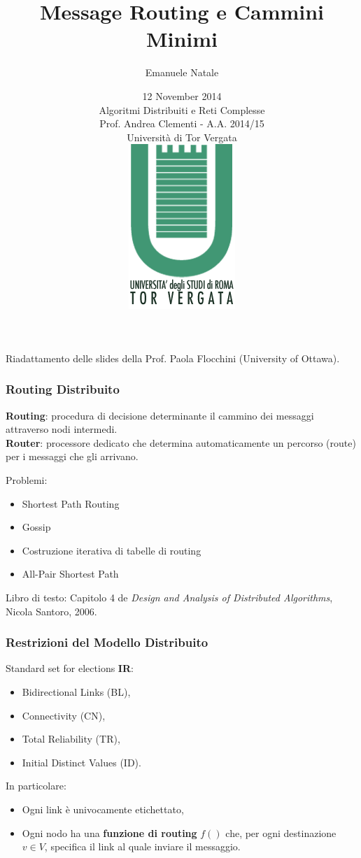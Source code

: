\documentclass[10pt,xcolor=dvipsnames]{beamer}
\author[Emanuele Natale]{Emanuele Natale}
\institute{Sapienza Università di Roma 
}
\title{Message Routing e Cammini Minimi}
\date{12 November 2014 \\ 
Algoritmi Distribuiti e Reti Complesse \\ Prof. Andrea Clementi - A.A. 2014/15 
\\ Università di Tor Vergata \\ 
\vspace{8pt}\includegraphics[scale=0.28]{logo-uniroma2.png}} %
\begin{document}
\begin{frame}
	\titlepage
\vfill

{\tiny Riadattamento delle slides della Prof. Paola Flocchini (University of Ottawa).}
\end{frame}

\begin{frame}
	\frametitle{Routing Distribuito}

	\textbf{Routing}: procedura di decisione determinante il cammino dei messaggi attraverso nodi intermedi.
	\\
	\textbf{Router}: processore dedicato che determina automaticamente un percorso (route) 
	per i messaggi che gli arrivano.

	\vfill

	Problemi:
	\begin{itemize}
		\item Shortest Path Routing
		\item Gossip
		\item Costruzione iterativa di tabelle di routing
		\item All-Pair Shortest Path
	\end{itemize}

	\vfill

	Libro di testo: Capitolo 4 de \textit{Design and Analysis of Distributed Algorithms}, Nicola Santoro, 2006.
\end{frame}

\begin{frame}
	\frametitle{Restrizioni del Modello Distribuito}
	
	Standard set for elections \textbf{IR}: 
	\begin{itemize}
		\item Bidirectional Links (BL),
		\item Connectivity (CN),
		\item Total Reliability (TR),
		\item Initial Distinct Values (ID).
	\end{itemize}

	\vfill

	In particolare: 
	\begin{itemize}
		\item Ogni link è univocamente etichettato,
		\item Ogni nodo ha una \textbf{funzione di routing} $f()$ che, 
			per ogni destinazione $v\in V$, specifica il link al quale inviare il messaggio.
	\end{itemize}
\end{frame}
\end{document}
